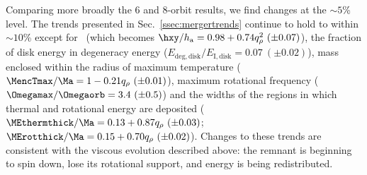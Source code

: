 

Comparing more broadly the 6 and 8-orbit results, we find changes at the $\sim\!5$\% level.  The trends presented in Sec.~\ref{ssec:mergertrends} continue to hold to within $\sim\!10$\% except for \hxy\ (which becomes $\hxy/h_{\rm a} = 0.98 + 0.74q_\rho^2~(\pm0.07)$), the fraction of disk energy in degeneracy energy ($E_\mathrm{deg,disk}/E_\mathrm{I,disk} = 0.07~(\pm0.02)$), mass enclosed within the radius of maximum temperature ($\MencTmax/\Ma = 1-0.21q_\rho~(\pm 0.01)$), maximum rotational frequency ($\Omegamax/\Omegaorb = 3.4~(\pm0.5)$) and the widths of the regions in which thermal and rotational energy are deposited ($\MEthermthick/\Ma = 0.13 + 0.87q_\rho ~(\pm0.03)$; $\MErotthick/\Ma = 0.15 + 0.70q_\rho ~(\pm0.02)$).  Changes to these trends are consistent with the viscous evolution described above: the remnant is beginning to spin down, lose its rotational support, and energy is being redistributed.

